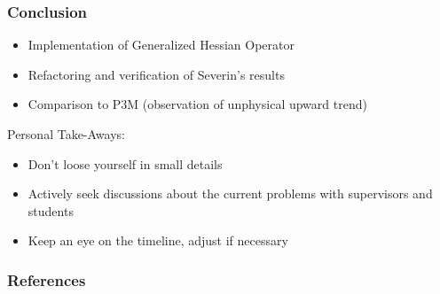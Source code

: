 \documentclass[.08pt,aspectratio=169,t]{beamer}
\begin{document}
\begin{frame}
    \frametitle{Conclusion}

\begin{itemize}[label=$\bullet$]
     \setlength{\itemsep}{3mm}
     \item Implementation of Generalized Hessian Operator
     \item Refactoring and verification of Severin's results
     \item Comparison to P3M (observation of unphysical upward trend)
 \end{itemize}
 \vspace{5mm}

 Personal Take-Aways:

\begin{itemize}[label=$\bullet$]
     \setlength{\itemsep}{3mm}
     \item Don't loose yourself in small details
     \item Actively seek discussions about the current problems with supervisors and students
     \item Keep an eye on the timeline, adjust if necessary
 \end{itemize}

\end{frame}

 \begin{frame}[allowframebreaks]
     \frametitle{References}
     
     
 \end{frame}
\end{document}
